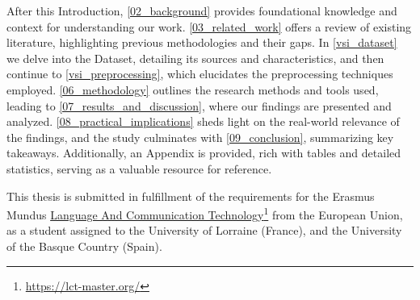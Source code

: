 \label{01_thesis_structure}

After this Introduction,  \headerName{} \ref{02_background} provides foundational knowledge and context for understanding our work. \headerName{} \ref{03_related_work} offers a review of existing literature, highlighting previous methodologies and their gaps. In \headerName{} \ref{vsi_dataset} we delve into the Dataset, detailing its sources and characteristics, and then continue to \headerName{} \ref{vsi_preprocessing}, which elucidates the preprocessing techniques employed. \headerName{} \ref{06_methodology} outlines the research methods and tools used, leading to \headerName{} \ref{07_results_and_discussion}, where our findings are presented and analyzed. \headerName{} \ref{08_practical_implications} sheds light on the real-world relevance of the findings, and the study culminates with \headerName{} \ref{09_conclusion}, summarizing key takeaways. %
Additionally, an Appendix is provided, rich with tables and detailed statistics, serving as a valuable resource for reference.

This thesis is submitted in fulfillment of the requirements for the Erasmus Mundus \href{https://lct-master.org/}{Language And Communication Technology}\footnote{\url{https://lct-master.org/}} from the European Union, as a student assigned to the University of Lorraine (France), and the University of the Basque Country (Spain).